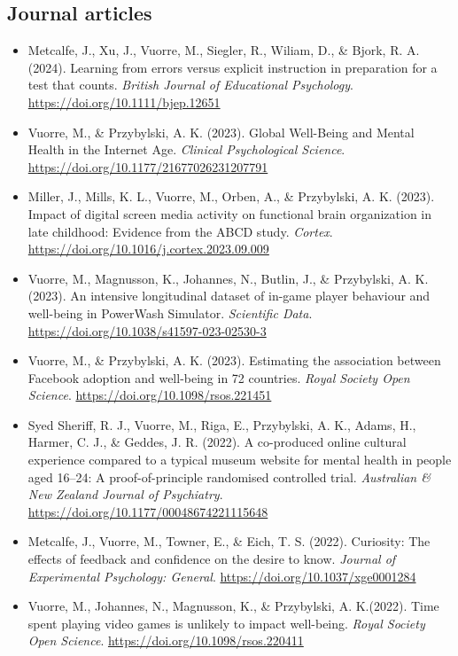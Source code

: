 \documentclass[12pt, a4paper]{article}
\newcommand{\years}[1]{\marginnote{\scriptsize #1}}
\begin{document}
\subsection*{Journal articles}
\begin{itemize}
  \item \years{2024} Metcalfe, J., Xu, J., Vuorre, M., Siegler, R., Wiliam, D., \& Bjork, R. A. (2024). Learning from errors versus explicit instruction in preparation for a test that counts. \emph{British Journal of Educational Psychology}. \url{https://doi.org/10.1111/bjep.12651}
  \item \years{2023} Vuorre, M., \& Przybylski, A. K. (2023). Global Well-Being and Mental Health in the Internet Age. \emph{Clinical Psychological Science}. \url{https://doi.org/10.1177/21677026231207791}
  \item Miller, J., Mills, K. L., Vuorre, M., Orben, A., \& Przybylski, A. K. (2023). Impact of digital screen media activity on functional brain organization in late childhood: Evidence from the ABCD study. \emph{Cortex}. \url{https://doi.org/10.1016/j.cortex.2023.09.009}
  \item Vuorre, M., Magnusson, K., Johannes, N., Butlin, J., \& Przybylski, A. K. (2023). An intensive longitudinal dataset of in-game player behaviour and well-being in PowerWash Simulator. \emph{Scientific Data}. \url{https://doi.org/10.1038/s41597-023-02530-3}
  \item Vuorre, M., \& Przybylski, A. K. (2023). Estimating the association between Facebook adoption and well-being in 72 countries. \emph{Royal Society Open Science}. \url{https://doi.org/10.1098/rsos.221451}
  \item \years{2022} Syed Sheriff, R. J., Vuorre, M., Riga, E., Przybylski, A. K., Adams, H., Harmer, C. J., \& Geddes, J. R. (2022). A co-produced online cultural experience compared to a typical museum website for mental health in people aged 16–24: A proof-of-principle randomised controlled trial. \emph{Australian \& New Zealand Journal of Psychiatry}. \url{https://doi.org/10.1177/00048674221115648}
  \item Metcalfe, J., Vuorre, M., Towner, E., \& Eich, T. S. (2022). Curiosity: The effects of feedback and confidence on the desire to know. \emph{Journal of Experimental Psychology: General}. \url{https://doi.org/10.1037/xge0001284}
  \item Vuorre, M.\footnotemark[1], Johannes, N.\footnotemark[1], Magnusson, K., \& Przybylski, A. K.\footnotemark[1] (2022). Time spent playing video games is unlikely to impact well-being. \emph{Royal Society Open Science}. \url{https://doi.org/10.1098/rsos.220411}

\end{itemize}
\end{document}
